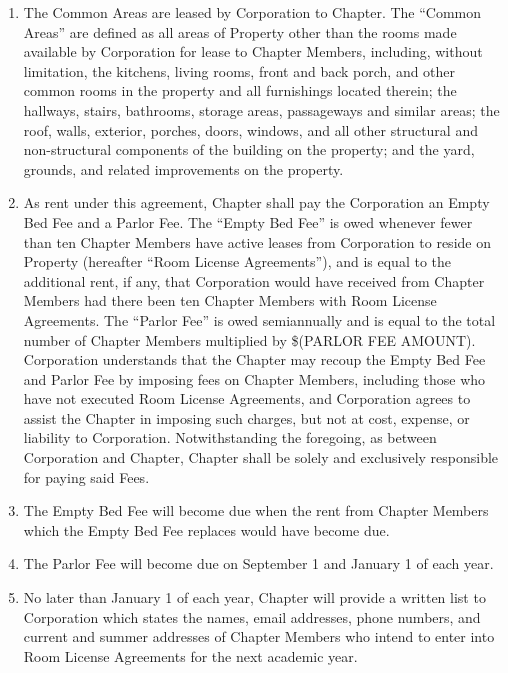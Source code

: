 \documentclass[12pt]{article}
\begin{document}
\begin{enumerate}
        \item The Common Areas are leased by Corporation to Chapter. The ``Common Areas'' are defined as all areas of Property other than the rooms made available by Corporation for lease to Chapter Members, including, without limitation, the kitchens, living rooms, front and back porch, and other common rooms in the property and all furnishings located therein; the hallways, stairs, bathrooms, storage areas, passageways and similar areas; the roof, walls, exterior, porches, doors, windows, and all other structural and non-structural components of the building on the property; and the yard, grounds, and related improvements on the property.

        \item As rent under this agreement, Chapter shall pay the Corporation an Empty Bed Fee and a Parlor Fee.
                The ``Empty Bed Fee'' is owed whenever fewer than ten Chapter Members have active leases from Corporation to reside on Property (hereafter ``Room License Agreements''), and is equal to the additional rent, if any, that Corporation would have received from Chapter Members had there been ten Chapter Members with Room License Agreements.
                The ``Parlor Fee'' is owed semiannually and is equal to the total number of Chapter Members multiplied by \$(PARLOR FEE AMOUNT).
                Corporation understands that the Chapter may recoup the Empty Bed Fee and Parlor Fee by imposing fees on Chapter Members, including those who have not executed Room License Agreements, and Corporation agrees to assist the Chapter in imposing such charges, but not at  cost, expense, or liability to Corporation.
                Notwithstanding the foregoing, as between Corporation and Chapter, Chapter shall be solely and exclusively responsible for paying said Fees.

        \item The Empty Bed Fee will become due when the rent from Chapter Members which the Empty Bed Fee replaces would have become due.

        \item The Parlor Fee will become due on September 1 and January 1 of each year.

        \item No later than January 1 of each year, Chapter will provide a written list to Corporation which states the names, email addresses, phone numbers, and current and summer addresses of Chapter Members who intend to enter into Room License Agreements for the next academic year.


\end{enumerate}
\end{document}
